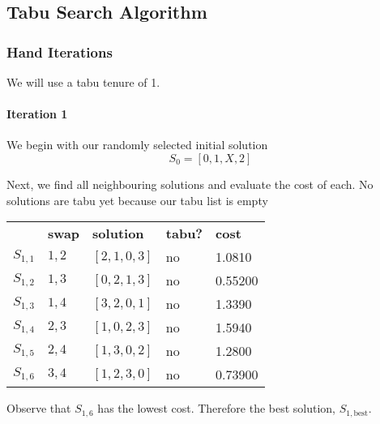 \documentclass[a4paper]{article}
\newcommand{\subsubsubsection}[1]{\paragraph{#1} \mbox{}}
\begin{document}



\subsection{Tabu Search Algorithm} %

\subsubsection{Hand Iterations}

We will use a tabu tenure of 1.

\subsubsubsection{Iteration 1}

We begin with our randomly selected initial solution
$$S_0 = [ 0, 1, X, 2 ]$$

Next, we find all neighbouring solutions and evaluate the cost of each. No solutions are tabu yet because our tabu list is empty

\begin{tabular}{lllll}
& \textbf{swap}   & \textbf{solution}    & \textbf{tabu?} & \textbf{cost}  \\

$S_{1,1}$ & $1,2$ & $[2, 1, 0, 3]$ & no & 1.0810   \\
$S_{1,2}$ & $1,3$ & $[0, 2, 1, 3]$ & no & 0.55200  \\
$S_{1,3}$ & $1,4$ & $[3, 2, 0, 1]$ & no & 1.3390   \\
$S_{1,4}$ & $2,3$ & $[1, 0, 2, 3]$ & no & 1.5940   \\
$S_{1,5}$ & $2,4$ & $[1, 3, 0, 2]$ & no & 1.2800   \\
$S_{1,6}$ & $3,4$ & $[1, 2, 3, 0]$ & no & 0.73900  \\
\end{tabular}

Observe that $S_{1,6}$ has the lowest cost. Therefore the best solution, $S_{1, \text{best}}$.
\end{document}
